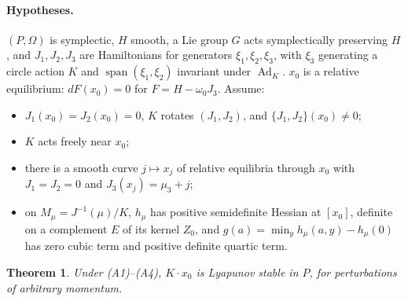 \documentclass[11pt]{article}
\numberwithin{equation}{section}
\newtheorem{theorem}{Theorem}[section]
\theoremstyle{definition}
\theoremstyle{remark}
\begin{document}
\paragraph{Hypotheses.} $(P,\Omega)$ is symplectic, $H$ smooth, a Lie group $G$ acts symplectically
preserving $H$, and $J_1,J_2,J_3$ are Hamiltonians for generators $\xi_1,\xi_2,\xi_3$, with $\xi_3$
generating a circle action $K$ and $\operatorname{span}(\xi_1,\xi_2)$ invariant under $\operatorname{Ad}_K$.
$x_0$ is a relative equilibrium: $dF(x_0)=0$ for $F=H-\omega_0J_3$. Assume:
\begin{itemize}
\item[(A1)] $J_1(x_0)=J_2(x_0)=0$, $K$ rotates $(J_1,J_2)$, and $\{J_1,J_2\}(x_0)\ne0$;
\item[(A2)] $K$ acts freely near $x_0$;
\item[(A3)] there is a smooth curve $j\mapsto x_j$ of relative equilibria through $x_0$ with $J_1=J_2=0$ and
$J_3(x_j)=\mu_3+j$;
\item[(A4)] on $M_\mu=J^{-1}(\mu)/K$, $h_\mu$ has positive semidefinite Hessian at $[x_0]$, definite on a
complement $E$ of its kernel $Z_0$, and $g(a)=\min_yh_\mu(a,y)-h_\mu(0)$ has zero cubic term and positive
definite quartic term.
\end{itemize}

\begin{theorem}\label{thm:abstract}
Under (A1)--(A4), $K\cdot x_0$ is Lyapunov stable in $P$, for perturbations of arbitrary momentum.
\end{theorem}
\end{document}

